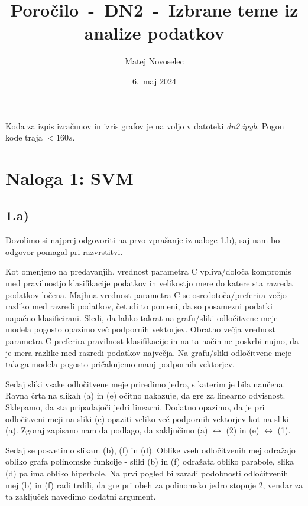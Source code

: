 \documentclass{article}
\begin{document}
\title{Poročilo~-~DN2~-~Izbrane teme iz analize podatkov \\
}
\author{
    Matej Novoselec\\
}
\date{6.\ maj 2024}

\maketitle

Koda za izpis izračunov in izris grafov je na voljo v datoteki \textit{dn2.ipyb}. 
Pogon kode traja $<160s$.

\section*{Naloga 1: SVM}

\subsection*{1.a)}
Dovolimo si najprej odgovoriti na prvo vprašanje iz naloge 1.b), saj nam bo odgovor pomagal pri razvrstitvi. 

Kot omenjeno na predavanjih, vrednost parametra C vpliva/določa kompromis med pravilnostjo klasifikacije podatkov in velikostjo mere do katere sta razreda podatkov ločena. 
Majhna vrednost parametra C se osredotoča/preferira večjo razliko med razredi podatkov, četudi to pomeni, da so posamezni podatki napačno klasificirani. 
Sledi, da lahko takrat na grafu/sliki odločitvene meje modela pogosto opazimo več podpornih vektorjev.
Obratno večja vrednost parametra C preferira pravilnost klasifikacije in na ta način ne poskrbi nujno, da je mera razlike med razredi podatkov največja.
Na grafu/sliki odločitvene meje takega modela pogosto pričakujemo manj podpornih vektorjev. 

Sedaj sliki vsake odločitvene meje priredimo jedro, s katerim je bila naučena. 
Ravna črta na slikah (a) in (e) očitno nakazuje, da gre za linearno odvisnost. Sklepamo, da sta pripadajoči jedri linearni. 
Dodatno opazimo, da je pri odločitveni meji na sliki (e) opaziti veliko več podpornih vektorjev kot na sliki (a). Zgoraj zapisano nam da podlago, da zaključimo (a) $\leftrightarrow$ (2) in (e) $\leftrightarrow$ (1).

Sedaj se posvetimo slikam (b), (f) in (d). Oblike vseh odločitvenih mej odražajo obliko grafa polinomske funkcije - sliki (b) in (f) odražata obliko parabole, slika (d) pa ima obliko hiperbole.
Na prvi pogled bi zaradi podobnosti odločitvenih mej (b) in (f) radi trdili, da gre pri obeh za polinomsko jedro stopnje 2, vendar za ta zaključek navedimo dodatni argument. 
\end{document}
